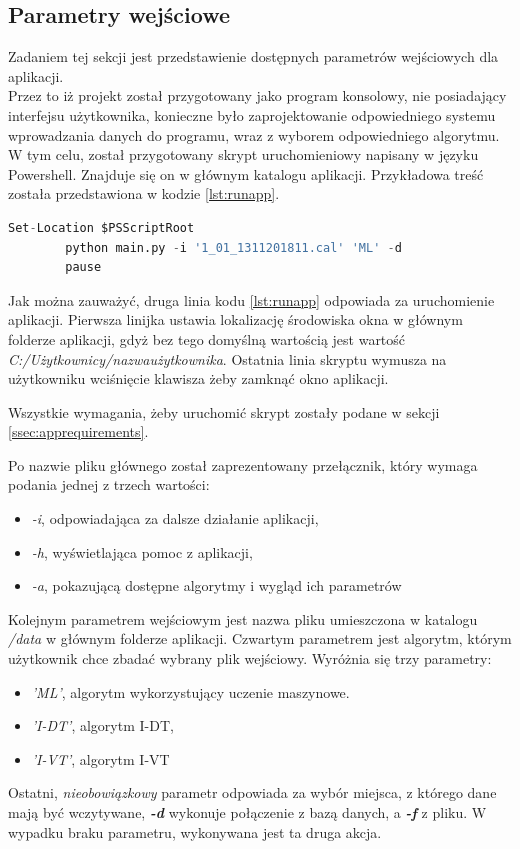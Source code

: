 \subsection{Parametry wejściowe}
\label{ssec:parameters}
Zadaniem tej sekcji jest przedstawienie dostępnych parametrów wejściowych dla aplikacji.\\
Przez to iż projekt został przygotowany jako program konsolowy, nie posiadający interfejsu użytkownika, konieczne było zaprojektowanie odpowiedniego systemu wprowadzania danych do programu, wraz z wyborem odpowiedniego algorytmu. W tym celu, został przygotowany skrypt uruchomieniowy napisany w języku Powershell. Znajduje się on w głównym katalogu aplikacji. Przykładowa treść została przedstawiona w kodzie \ref{lst:runapp}.\par
\begin{lstlisting}[language=Python, caption=Skrypt uruchomieniowy aplikacji, label={lst:runapp}]
        Set-Location $PSScriptRoot
        python main.py -i '1_01_1311201811.cal' 'ML' -d
        pause
\end{lstlisting}
Jak można zauważyć, druga linia kodu \ref{lst:runapp} odpowiada za uruchomienie aplikacji. Pierwsza linijka ustawia lokalizację środowiska okna w głównym folderze aplikacji, gdyż bez tego domyślną wartością jest wartość \emph{C:/Użytkownicy/nazwaużytkownika}. Ostatnia linia skryptu wymusza na użytkowniku wciśnięcie klawisza żeby zamknąć okno aplikacji.\par
Wszystkie wymagania, żeby uruchomić skrypt zostały podane w sekcji \ref{ssec:apprequirements}.\par
Po nazwie pliku głównego został zaprezentowany przełącznik, który wymaga podania jednej z trzech wartości:
\begin{itemize}
        \item \emph{-i}, odpowiadająca za dalsze działanie aplikacji,
        \item \emph{-h}, wyświetlająca pomoc z aplikacji,
        \item \emph{-a}, pokazującą dostępne algorytmy i wygląd ich parametrów
\end{itemize}
Kolejnym parametrem wejściowym jest nazwa pliku umieszczona w katalogu \emph{/data} w głównym folderze aplikacji. Czwartym parametrem jest algorytm, którym użytkownik chce zbadać wybrany plik wejściowy. Wyróżnia się trzy parametry:
\begin{itemize}
        \item \emph{'ML'}, algorytm wykorzystujący uczenie maszynowe.
        \item \emph{'I-DT'}, algorytm I-DT,
        \item \emph{'I-VT'}, algorytm I-VT
\end{itemize}
Ostatni, \emph{nieobowiązkowy} parametr odpowiada za wybór miejsca, z którego dane mają być wczytywane, \emph{\textbf{-d}} wykonuje połączenie z bazą danych, a \emph{\textbf{-f}} z pliku. W wypadku braku parametru, wykonywana jest ta druga akcja.
